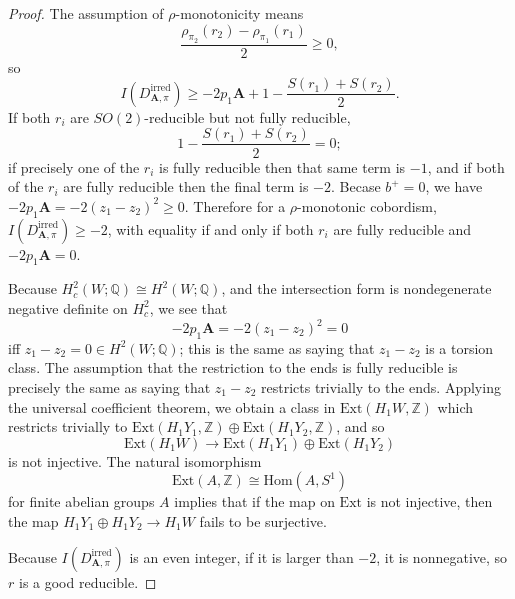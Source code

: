 \documentclass{memo-l}
\theoremstyle{definition}
\theoremstyle{remark}
\numberwithin{section}{chapter}
\numberwithin{equation}{chapter}
\begin{document}
\begin{proof}The assumption of $\rho$-monotonicity means 
$$\frac{\rho_{\pi_2}(r_2) - \rho_{\pi_1}(r_1)}{2} \geq 0,$$ 
so 
$$I(D^{\text{irred}}_{\mathbf{A},\pi}) \geq -2p_1 \mathbf{A} + 1 - \frac{S(r_1)+S(r_2)}{2}.$$ 
If both $r_i$ are $SO(2)$-reducible but not fully reducible, $$1 - \frac{S(r_1)+S(r_2)}{2} = 0;$$ if precisely one of the $r_i$ is fully reducible then that same term is $-1$, and if both of the $r_i$ are fully reducible then the final term is $-2$. Becase $b^+ = 0$, we have $-2p_1 \mathbf{A} = -2(z_1 - z_2)^2 \geq 0$. Therefore for a $\rho$-monotonic cobordism, $I(D^{\text{irred}}_{\mathbf{A},\pi}) \geq -2$, with equality if and only if both $r_i$ are fully reducible and $-2 p_1 \mathbf{A} = 0$. 

Because $H^2_c(W;\mathbb Q) \cong H^2(W;\mathbb Q)$, and the intersection form is nondegenerate negative definite on $H^2_c$, we see that 
$$-2p_1 \mathbf{A} = -2(z_1 - z_2)^2 = 0$$ 
iff $z_1 - z_2 = 0 \in H^2(W;\mathbb Q)$; this is the same as saying that $z_1 - z_2$ is a torsion class. The assumption that the restriction to the ends is fully reducible is precisely the same as saying that $z_1 - z_2$ restricts trivially to the ends. Applying the universal coefficient theorem, we obtain a class in $\text{Ext}(H_1 W, \mathbb Z)$ which restricts trivially to $\text{Ext}(H_1 Y_1, \mathbb Z) \oplus \text{Ext}(H_1 Y_2, \mathbb Z)$, and so 
$$\text{Ext}(H_1 W) \to \text{Ext}(H_1 Y_1) \oplus \text{Ext}(H_1 Y_2)$$ 
is not injective. The natural isomorphism $$\text{Ext}(A, \mathbb Z) \cong \text{Hom}(A, S^1)$$ for finite abelian groups $A$ implies that if the map on $\text{Ext}$ is not injective, then the map $H_1 Y_1 \oplus H_1 Y_2 \to H_1 W$ fails to be surjective.

Because $I(D^{\text{irred}}_{\mathbf{A},\pi})$ is an even integer, if it is larger than $-2$, it is nonnegative, so $r$ is a good reducible. 
\end{proof}
\end{document}
